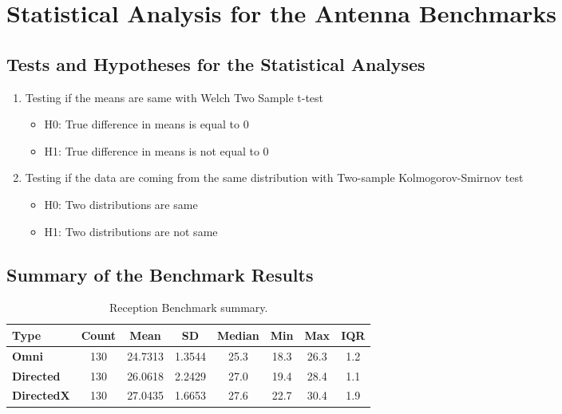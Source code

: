 
\chapter{Statistical Analysis for the Antenna Benchmarks}\label{stat-ant}
\singlespacing
\vspace{-1cm}
\hypertarget{hypothesis-testing}{%
\section{Tests and Hypotheses for the Statistical Analyses}\label{hypothesis-testing}}

\begin{enumerate}
\setlength{\itemsep}{0em}
\item Testing if the means are same with Welch Two Sample t-test
\begin{itemize} 
\setlength{\itemsep}{0em}
\item H0: True difference in means is equal to 0
\item H1: True difference in means is not equal to 0
\end{itemize} 
\item Testing if the data are coming from the same distribution with
Two-sample Kolmogorov-Smirnov test
\begin{itemize} 
\setlength{\itemsep}{0em}
\item H0: Two distributions are same
\item H1: Two distributions are not same
\end{itemize} 
\end{enumerate}




\section{Summary of the Benchmark Results}\label{bench-sum}

\renewcommand{\arraystretch}{1.2}%
\begin{table}[H]
\begin{center}
\caption{Reception Benchmark summary.}
\label{tab:rbs}
\begin{adjustbox}{max width=\textwidth}
\begin{tabular}{| l || c | c | c | c | c | c | c |}
\hline
\rowcolor{lightgray}
\textbf{Type} & \textbf{Count} & \textbf{Mean} & \textbf{SD}  & \textbf{Median} & \textbf{Min} & \textbf{Max}  & \textbf{IQR}\tabularnewline \hline \hline 
\cellcolor{lightgray} \textbf{Omni}     & 130 & 24.7313 & 1.3544 & 25.3 & 18.3 & 26.3 & 1.2 \tabularnewline \hline
\cellcolor{lightgray} \textbf{Directed} & 130 & 26.0618 & 2.2429 & 27.0 & 19.4 & 28.4 & 1.1 \tabularnewline \hline
\cellcolor{lightgray} \textbf{DirectedX} & 130 & 27.0435 & 1.6653 & 27.6 & 22.7 & 30.4 & 1.9 \tabularnewline \hline
\end{tabular}
\end{adjustbox}
\end{center}
\end{table}
\renewcommand{\arraystretch}{1}%



